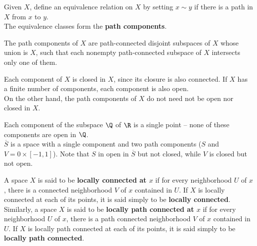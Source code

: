 \begin{definition}
Given $X$, define an equivalence relation on $X$ by setting $x \sim y$ if there is a path in $X$ from $x$ to $y$. \\

The equivalence classes form the \textbf{path components}.
\end{definition}

\begin{theorem}
The path components of $X$ are path-connected disjoint subspaces of $X$ whose union is $X$, such that each nonempty path-connected subspace of $X$ intersects only one of them.
\end{theorem}

\begin{remark}
Each component of $X$ is closed in $X$, since its closure is also connected. If $X$ has a finite number of components, each component is also open. \\

On the other hand, the path components of $X$ do not need not be open nor closed in $X$.
\end{remark}

\begin{eg}
Each component of the subspace $\Q$ of $\R$ is a single point -- none of these components are open in $\Q$. \\

$\overline{S}$ is a space with a single component and two path components ($S$ and $V = 0 \times [-1, 1]$). Note that $S$ in open in $\overline{S}$ but not closed, while $V$ is closed but not open.
\end{eg}
    
\begin{definition}
A space $X$ is said to be \textbf{locally connected at $x$} if for every neighborhood $U$ of $x$, there is a connected neighborhood $V$ of $x$ contained in $U$.
If $X$ is locally connected at each of its points, it is said simply to be \textbf{locally connected}. \\

Similarly, a space $X$ is said to be \textbf{locally path connected at $x$} if for every neighborhood $U$ of $x$, there is a path connected neighborhood $V$ of $x$ contained in $U$.
If $X$ is locally path connected at each of its points, it is said simply to be \textbf{locally path connected}. \\
\end{definition}

